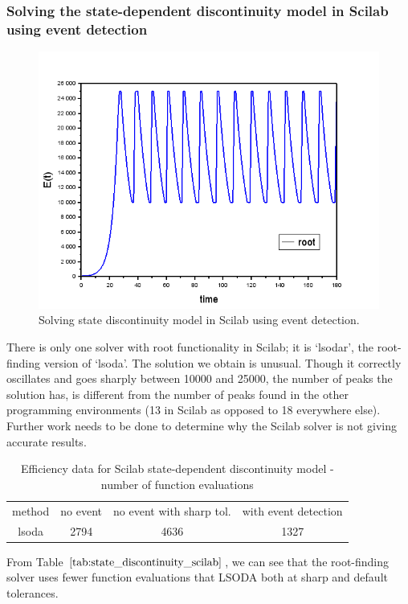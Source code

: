 \subsubsection{Solving the state-dependent discontinuity model in Scilab using event detection}
\begin{figure}[H]
\centering
\includegraphics[width=0.7\linewidth]{./figures/solve_state_discontinuity_scilab}
\caption{Solving state discontinuity model in Scilab using event detection.}
\label{fig:solve_state_discontinuity_scilab}
\end{figure}
There is only one solver with root functionality in Scilab; it is `lsodar', the root-finding version of `lsoda'. The solution we obtain is unusual. Though it correctly oscillates and goes sharply between 10000 and 25000, the number of peaks the solution has, is different from the number of peaks found in the other programming environments (13 in Scilab as opposed to 18 everywhere else). Further work needs to be done to determine why the Scilab solver is not giving accurate results.

\begin{table}[h]
\caption {Efficiency data for Scilab state-dependent discontinuity model - number of function evaluations} \label{tab:state_discontinuity_scilab}
\begin{center}
\begin{tabular}{ c c c c } 
method & no event & no event with sharp tol. & with event detection \\ 
lsoda & 2794 & 4636 & 1327 \\
\end{tabular}
\end{center}
\end{table}

From Table $\ref{tab:state_discontinuity_scilab}$, we can see that the root-finding solver uses fewer function evaluations that LSODA both at sharp and default tolerances.

